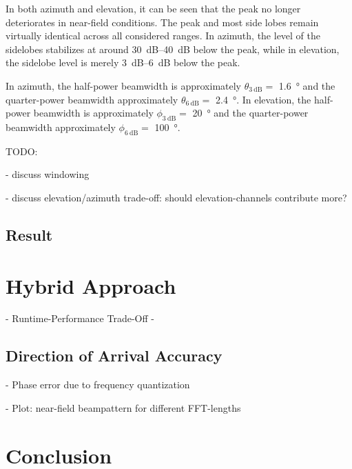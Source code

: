 In both azimuth and elevation, it can be seen that the peak no longer deteriorates in near-field conditions.
The peak and most side lobes remain virtually identical across all considered ranges.
In azimuth, the level of the sidelobes stabilizes at around \SIrange{30}{40}{\dB} below the peak,
while in elevation, the sidelobe level is merely \SIrange{3}{6}{\dB} below the peak.

In azimuth, the half-power beamwidth is approximately $\theta_{\SI{3}{\dB}}=$ \SI{1.6}{\degree} and
the quarter-power beamwidth approximately $\theta_{\SI{6}{\dB}}=$ \SI{2.4}{\degree}.
In elevation, the half-power beamwidth is approximately $\phi_{\SI{3}{\dB}}=$ \SI{20}{\degree} and
the quarter-power beamwidth approximately $\phi_{\SI{6}{\dB}}=$ \SI{100}{\degree}.

TODO:

- discuss windowing

- discuss elevation/azimuth trade-off: should elevation-channels contribute more?



\subsection{Result}


\section{Hybrid Approach}

- Runtime-Performance Trade-Off
-
\subsection{Direction of Arrival Accuracy}
- Phase error due to frequency quantization

- Plot: near-field beampattern for different FFT-lengths

\section{Conclusion}

